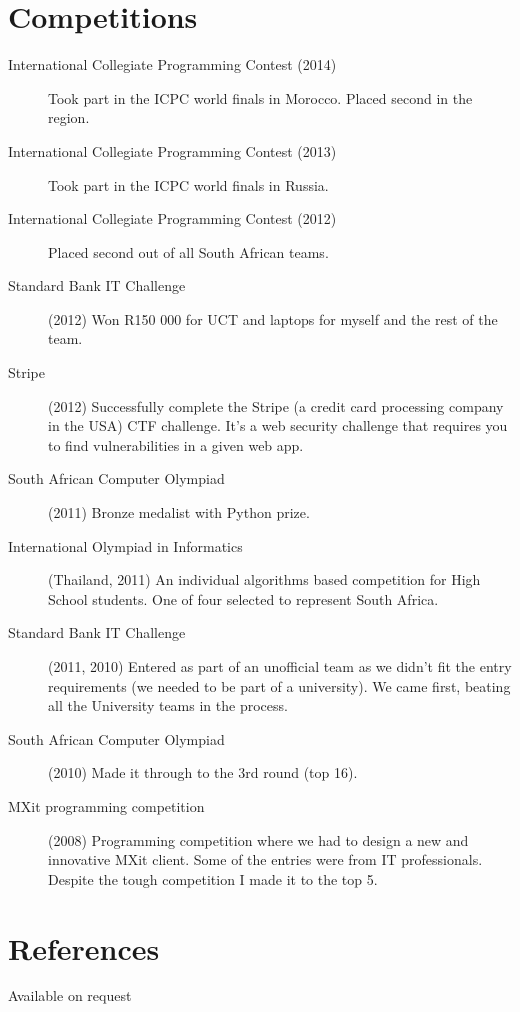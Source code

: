 \documentclass[margin,line,a4paper]{resume}
\begin{document}
\begin{resume}
        \section{\mysidestyle Competitions}
            \begin{description}
                \item [International Collegiate Programming Contest (2014)] Took part in the ICPC world finals in Morocco. Placed second in the region.
                \item [International Collegiate Programming Contest (2013)] Took part in the ICPC world finals in Russia.
                \item [International Collegiate Programming Contest (2012)] Placed second out of all South African teams.
                \item [Standard Bank IT Challenge] (2012) Won R150 000 for UCT and laptops for myself and the rest of the team.
                \item [Stripe] (2012) Successfully complete the Stripe (a credit card processing company in the USA) CTF challenge. 
                    It's a web security challenge that requires you to find vulnerabilities in a given web app.

                \item [South African Computer Olympiad] (2011) Bronze medalist with Python prize.

                \item [International Olympiad in Informatics] (Thailand, 2011) An individual 
                algorithms based competition for High School students. One of four selected
                to represent South Africa.

                \item [Standard Bank IT Challenge] (2011, 2010) Entered as part of an unofficial team
                as we didn't fit the entry requirements (we needed to be part of a university).
                We came first, beating all the University teams in the process.

                \item [South African Computer Olympiad] (2010) Made it through to the 3rd
                round (top 16).

                \item [MXit programming competition] (2008) Programming competition where we
                had to design a new and innovative MXit client.  Some of the
                entries were from IT professionals. Despite the tough competition I made it to the top 5.
            \end{description}

        \section{\mysidestyle References}
            Available on request
    \end{resume}
\end{document}
